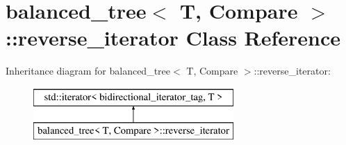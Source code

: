 \hypertarget{classbalanced__tree_1_1reverse__iterator}{\section{balanced\+\_\+tree$<$ T, Compare $>$\+:\+:reverse\+\_\+iterator Class Reference}
\label{classbalanced__tree_1_1reverse__iterator}
}
Inheritance diagram for balanced\+\_\+tree$<$ T, Compare $>$\+:\+:reverse\+\_\+iterator\+:\begin{figure}[H]
\begin{center}
\leavevmode
\includegraphics[height=2.000000cm]{classbalanced__tree_1_1reverse__iterator}
\end{center}
\end{figure}
